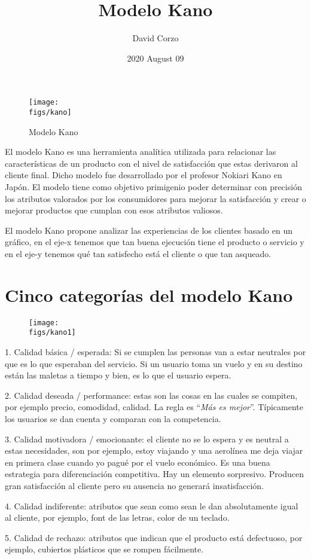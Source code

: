 \documentclass{article}
\title{Modelo Kano}
\date{2020 August 09} %
\author{David Corzo}
\newcommand{\figs}{./../../../_____figs_____}
\begin{document}
\maketitle

\begin{wrapfigure}{R}{0.3\textwidth}
    \texttt{[image: \\figs/kano]}
    \caption{Modelo Kano}
\end{wrapfigure}
El modelo Kano es una herramienta analítica utilizada para relacionar las características de un producto con el nivel de satisfacción que estas derivaron al cliente final. Dicho modelo fue desarrollado por el profesor Nokiari Kano en Japón. El modelo tiene como objetivo primigenio poder determinar con precisión los atributos valorados por los consumidores para mejorar la satisfacción y crear o mejorar productos que cumplan con esos atributos valiosos. \cite{kanomodel} \par
El modelo Kano propone analizar las experiencias de los clientes basado en un gráfico, en el eje-x tenemos que tan buena ejecución tiene el producto o servicio y en el eje-y tenemos qué tan satisfecho está el cliente o que tan asqueado. \cite{videokano}

\section*{Cinco categorías del modelo Kano}
\begin{wrapfigure}{R}{0.3\textwidth}
    \centering
    \texttt{[image: \\figs/kano1]} 
\end{wrapfigure}
1. Calidad básica / esperada: Si se cumplen las personas van a estar neutrales por que es lo que esperaban del servicio. Si un usuario toma un vuelo y en su destino están las maletas a tiempo y bien, es lo que el usuario espera. \par
2. Calidad deseada / performance: estas son las cosas en las cuales se compiten, por ejemplo precio, comodidad, calidad. La regla es ``\emph{Más es mejor}''. Típicamente los usuarios se dan cuenta y comparan con la competencia. \par
3. Calidad motivadora / emocionante: el cliente no se lo espera y es neutral a estas necesidades, son por ejemplo, estoy viajando y una aerolínea me deja viajar en primera clase cuando yo pagué por el vuelo económico. Es una buena estrategia para diferenciación competitiva. Hay un elemento sorpresivo. Producen gran satisfacción al cliente pero su ausencia no generará insatisfacción.  \par
4. Calidad indiferente: atributos que sean como sean le dan absolutamente igual al cliente, por ejemplo, font de las letras, color de un teclado. \par
5. Calidad de rechazo: atributos que indican que el producto está defectuoso, por ejemplo, cubiertos plásticos que se rompen fácilmente. \par
\end{document}
